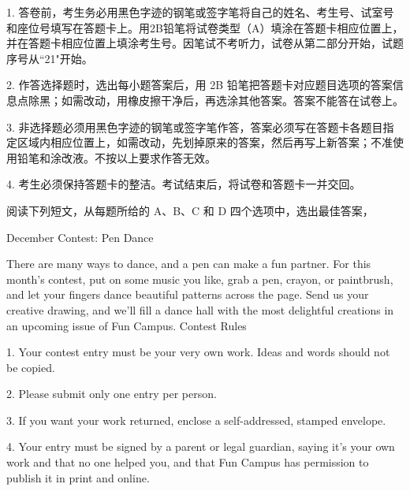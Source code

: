 \documentclass{英语试卷}
\begin{document}
\begin{notice}
\par 1. 答卷前，考生务必用黑色字迹的钢笔或签字笔将自己的姓名、考生号、试室号和座位号填写在答题卡上。用2B铅笔将试卷类型（A）填涂在答题卡相应位置上，并在答题卡相应位置上填涂考生号。因笔试不考听力，试卷从第二部分开始，试题序号从“21"开始。\par
\par 2. 作答选择题时，选出每小题答案后，用 2B 铅笔把答题卡对应题目选项的答案信息点除黑；如需改动，用橡皮擦干净后，再选涂其他答案。答案不能答在试卷上。\par
\par 3. 非选择题必须用黑色字迹的钢笔或签字笔作答，答案必须写在答题卡各题目指定区域内相应位置上，如需改动，先划掉原来的答案，然后再写上新答案；不准使用铅笔和涂改液。不按以上要求作答无效。\par
\par 4. 考生必须保持答题卡的整洁。考试结束后，将试卷和答题卡一并交回。\par
\end{notice}
\par 阅读下列短文，从每题所给的 A、B、C 和 D 四个选项中，选出最佳答案，\par
{}
\par December Contest: Pen Dance\par
\par There are many ways to dance, and a pen can make a fun partner. For this month's contest, put on some music you like, grab a pen, crayon, or paintbrush, and let your fingers dance beautiful patterns across the page. Send us your creative drawing, and we'll fill a dance hall with the most delightful creations in an upcoming issue of Fun Campus. Contest Rules\par
\par 1. Your contest entry must be your very own work. Ideas and words should not be copied.\par
\par 2. Please submit only one entry per person.\par
\par 3. If you want your work returned, enclose a self-addressed, stamped envelope.\par
\par 4. Your entry must be signed by a parent or legal guardian, saying it's your own work and that no one helped you, and that Fun Campus has permission to publish it in print and online.\par
\end{document}
